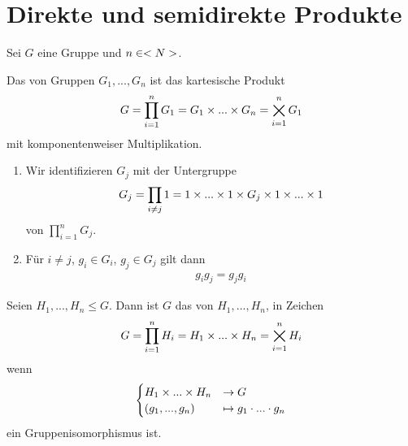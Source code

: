 \section{Direkte und semidirekte Produkte}

Sei $G$ eine Gruppe und $n\in<N>$.

\begin{definition}
	Das  von Gruppen $G_1,...,G_n$ ist das kartesische Produkt
	\begin{align}
		G=\prod_{i=1}^n G_1 = G_1\times ...\times G_n=\bigtimes_{i=1}^n G_1\notag
	\end{align}
	mit komponentenweiser Multiplikation.
\end{definition}

\begin{remark}
	\begin{enumerate}[label=(\alph*)]
		\item Wir identifizieren $G_j$ mit der Untergruppe
		\begin{align}
			G_j = \prod_{i\neq j} 1 = 1\times ...\times 1\times G_j\times 1 \times ...\times 1\notag
		\end{align}
		von $\prod_{i=1}^n G_j$.
		\item Für $i\neq j$, $g_i\in G_i$, $g_j\in G_j$ gilt dann
		\begin{align}
			\label{1.1}
			g_ig_j=g_jg_i
		\end{align}
	\end{enumerate}
\end{remark}

\begin{definition}
	Seien $H_1,...,H_n\le G$. Dann ist $G$ das  von $H_1,...,H_n$, in Zeichen
	\begin{align}
		G = \prod_{i=1}^n H_i = H_1\times ...\times H_n=\bigtimes_{i=1}^n H_i\notag
	\end{align} 
	wenn
	\begin{align}
		\begin{cases}
		H_1\times ...\times H_n &\to G \\
		(g_1,...,g_n) &\mapsto g_1\cdot ...\cdot g_n
		\end{cases}\notag
	\end{align}
	ein Gruppenisomorphismus ist.
\end{definition}

